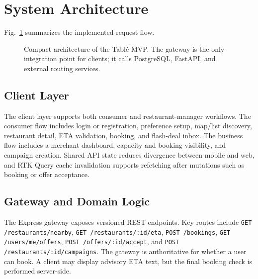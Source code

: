 \documentclass[conference]{IEEEtran}
\begin{document}
\section{System Architecture}
Fig.~\ref{fig:architecture} summarizes the implemented request flow.

\begin{figure}[htbp]
\centering
{}
\caption{Compact architecture of the Tabl\'e MVP. The gateway is the only integration point for clients; it calls PostgreSQL, FastAPI, and external routing services.}
\label{fig:architecture}
\end{figure}

\subsection{Client Layer}
The client layer supports both consumer and restaurant-manager workflows. The consumer flow includes login or registration, preference setup, map/list discovery, restaurant detail, ETA validation, booking, and flash-deal inbox. The business flow includes a merchant dashboard, capacity and booking visibility, and campaign creation. Shared API state reduces divergence between mobile and web, and RTK Query cache invalidation supports refetching after mutations such as booking or offer acceptance.

\subsection{Gateway and Domain Logic}
The Express gateway exposes versioned REST endpoints. Key routes include \texttt{GET /restaurants/nearby}, \texttt{GET /restaurants/:id/eta}, \texttt{POST /bookings}, \texttt{GET /users/me/offers}, \texttt{POST /offers/:id/accept}, and \texttt{POST /restaurants/:id/campaigns}. The gateway is authoritative for whether a user can book. A client may display advisory ETA text, but the final booking check is performed server-side.
\end{document}
